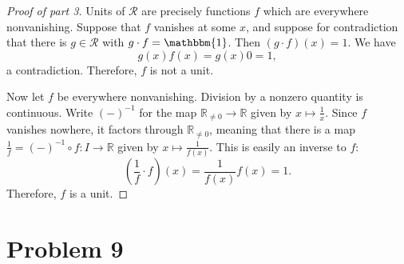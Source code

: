 \documentclass[11pt, letterpaper]{article}
\theoremstyle{plain}
\begin{document}
\begin{proof}[Proof of part 3]
	Units of $\mathcal{R} $ are precisely functions $f$ which are everywhere nonvanishing. Suppose that $f$ vanishes at some $x$, and suppose for contradiction that there is $g\in \mathcal{R} $ with $g\cdot f=\mathbbm{1}$. Then $(g\cdot f)(x)=1$. We have
	\[
		g(x)f(x)=g(x)0=1,
	\]
	a contradiction. Therefore, $f$ is not a unit.

	Now let $f$ be everywhere nonvanishing. Division by a nonzero quantity is continuous. Write $(-)^{-1} $ for the map $\mathbb{R}_{\neq 0} \to \mathbb{R} $ given by $x\mapsto \frac{1}{x} $. Since $f$ vanishes nowhere, it factors through $\mathbb{R} _{\neq 0} $, meaning that there is a map $\frac{1}{f} =(-)^{-1} \circ f : I \to \mathbb{R} $ given by $x\mapsto \frac{1}{f(x)} $. This is easily an inverse to $f$:
	\[
		\left( \frac{1}{f} \cdot f \right) (x)=\frac{1}{f(x)} f(x)=1
	.\]
	Therefore, $f$ is a unit.
\end{proof}

\section{Problem 9}
\end{document}

